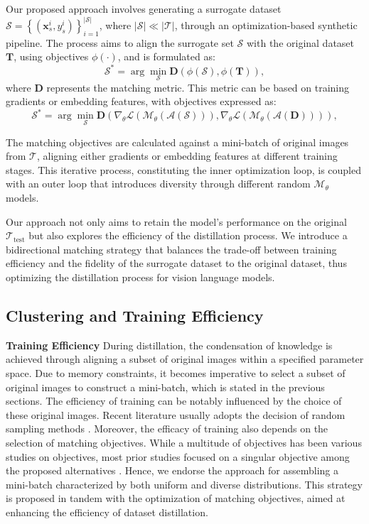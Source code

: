 \documentclass[sigconf, nonacm]{acmart}
\begin{document}
Our proposed approach involves generating a surrogate dataset $\mathcal{S}=\left\{\left(\boldsymbol{x}_s^i, y_s^i\right)\right\}_{i=1}^{|\mathcal{S}|}$, where $|\mathcal{S}| \ll|\mathcal{T}|$, through an optimization-based synthetic pipeline. The process aims to align the surrogate set $\mathcal{S}$ with the original dataset $\mathbf{T}$, using objectives $\phi(\cdot)$, and is formulated as:
\begin{equation}
\mathcal{S}^*=\arg \min _{\mathcal{S}} \mathbf{D}\left(\phi(\mathcal{S}), \phi(\mathbf{T})\right),
\end{equation}
where $\mathbf{D}$ represents the matching metric. This metric can be based on training gradients or embedding features, with objectives expressed as:
\begin{equation}
\mathcal{S}^*=\arg \min _{\mathcal{S}} \mathbf{D}\left(\nabla_\theta \mathcal{L}\left(\mathcal{M}_\theta(\mathcal{A}(\mathcal{S}))\right), \nabla_\theta \mathcal{L}\left(\mathcal{M}_\theta(\mathcal{A}(\mathbf{D}))\right)\right),
\end{equation}

The matching objectives are calculated against a mini-batch of original images from $\mathcal{T}$, aligning either gradients or embedding features at different training stages. This iterative process, constituting the inner optimization loop, is coupled with an outer loop that introduces diversity through different random $\mathcal{M}_\theta$ models.

Our approach not only aims to retain the model's performance on the original $\mathcal{T}_{\text{test}}$ but also explores the efficiency of the distillation process. We introduce a bidirectional matching strategy that balances the trade-off between training efficiency and the fidelity of the surrogate dataset to the original dataset, thus optimizing the distillation process for vision language models.

\subsection{Clustering and Training Efficiency}

\textbf{Training Efficiency}
During distillation, the condensation of knowledge is achieved through aligning a subset of original images within a specified parameter space. Due to memory constraints, it becomes imperative to select a subset of original images to construct a mini-batch, which is stated in the previous sections. The efficiency of training can be notably influenced by the choice of these original images. Recent literature usually adopts the decision of random sampling methods \cite{zhao2020dataset} \cite{kim2022dataset}. Moreover, the efficacy of training also depends on the selection of matching objectives. While a multitude of objectives has been various studies on objectives, most prior studies focused on a singular objective among the proposed alternatives \cite{kim2022dataset}. Hence, we endorse the approach for assembling a mini-batch characterized by both uniform and diverse distributions. This strategy is proposed in tandem with the optimization of matching objectives, aimed at enhancing the efficiency of dataset distillation.
\end{document}
